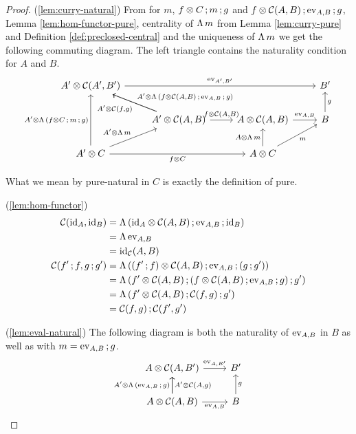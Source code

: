 \documentclass[runningheads,envcountsame]{llncs}
\begin{document}
\begin{proof}
    (\ref{lem:curry-natural}) From  for $m$, $\comp{\tensor{f}{C}}{\comp{m}{g}}$ and $\comp{\tensor{f}{\C(A, B)}}{\comp{\eval_{A, B}}{g}}$, Lemma \ref{lem:hom-functor-pure}, centrality of $\curry\,m$ from Lemma \ref{lem:curry-pure} and Definition \ref{def:preclosed-central} and the uniqueness of $\curry\,m$ we get the following commuting diagram. The left triangle contains the naturality condition for $A$ and $B$.
    \begin{equation}
    \begin{tikzcd}
        \tensor{A'}{\C(A', B')} \ar[rrr, "\eval_{A', B'}"] & & & B' \\
        & \tensor{A'}{\C(A, B)} \ar[ul, "{\tensor{A'}{\C(f, g)}}"] \ar[ul, swap, "{\tensor{A'}{\curry\,(\comp{\tensor{f}{\C(A, B)}}{\comp{\eval_{A, B}}{g}})}}"] \ar[r, "\tensor{f}{\C(A, B)}"] & \tensor{A}{\C(A, B)} \ar[r, "\eval_{A, B}"] & B \ar[u, swap, "g"] \\
        \tensor{A'}{C} \ar[uu, "\tensor{A'}{\curry\,(\comp{\tensor{f}{C}}{\comp{m}{g}})}"] \ar[ur, "\tensor{A'}{\curry\,m}"] \ar[rr, swap, "\tensor{f}{C}"] & & \tensor{A}{C} \ar[u, "\tensor{A}{\curry\,m}"] \ar[ur, swap, "m"]
    \end{tikzcd}
    \end{equation}
    
    What we mean by pure-natural in $C$ is exactly the definition of pure.
    
    (\ref{lem:hom-functor}) 
    \begin{align}
        \C(\id_A, \id_B) &= \curry\,(\comp{\tensor{\id_A}{\C(A, B)}}{\comp{\eval_{A, B}}{\id_B}}) \\
                         &= \curry\,\eval_{A, B} \\
                         &= \id_\C(A, B) \\
        \C(\comp{f'}{f}, \comp{g}{g'}) &= \curry\,(\comp{\tensor{(\comp{f'}{f})}{\C(A, B)}}{\comp{\eval_{A, B}}{(\comp{g}{g'})}}) \\
          &= \curry\,(\comp{\comp{\tensor{f'}{\C(A, B)}}{(\tensor{f}{\C(A, B)}}}{\comp{\eval_{A, B}}{\comp{g)}{g'}}}) \\
          &= \curry\,(\comp{\comp{\tensor{f'}{\C(A, B)}}{\C(f, g)}}{g'}) \\
          &= \comp{\C(f, g)}{\C(f', g')}
    \end{align}
    
    (\ref{lem:eval-natural}) The following diagram is both the naturality of $\eval_{A, B}$ in $B$ as well as  with $m = \comp{\eval_{A, B}}{g}$.
    \begin{equation}
        \begin{tikzcd}
            \tensor{A}{\C(A, B')} \ar[r, "\eval_{A, B'}"] & B' \\
            \tensor{A}{\C(A, B)} \ar[u, "\tensor{A'}{\curry\,(\comp{\eval_{A, B}}{g})}"] \ar[u, swap, "\tensor{A'}{\C(A, g)}"] \ar[r, swap, "\eval_{A, B}"] & B \ar[u, swap, "g"] 
        \end{tikzcd}
    \end{equation}
    

\end{proof}
\end{document}

